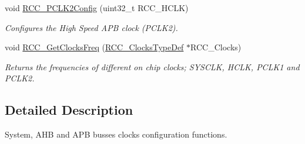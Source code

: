\begin{DoxyCompactItemize}
void \mbox{\hyperlink{group___r_c_c___group2_ga09f9c010a4adca9e036da42c2ca6126a}{R\+C\+C\+\_\+\+P\+C\+L\+K2\+Config}} (uint32\+\_\+t R\+C\+C\+\_\+\+H\+C\+LK)
\begin{DoxyCompactList}\small\item\em Configures the High Speed A\+PB clock (P\+C\+L\+K2). \end{DoxyCompactList}\item 
void \mbox{\hyperlink{group___r_c_c___group2_ga3e9944fd1ed734275222bbb3e3f29993}{R\+C\+C\+\_\+\+Get\+Clocks\+Freq}} (\mbox{\hyperlink{struct_r_c_c___clocks_type_def}{R\+C\+C\+\_\+\+Clocks\+Type\+Def}} $\ast$R\+C\+C\+\_\+\+Clocks)
\begin{DoxyCompactList}\small\item\em Returns the frequencies of different on chip clocks; S\+Y\+S\+C\+LK, H\+C\+LK, P\+C\+L\+K1 and P\+C\+L\+K2. \end{DoxyCompactList}\end{DoxyCompactItemize}


\subsection{Detailed Description}
System, A\+HB and A\+PB busses clocks configuration functions. 

